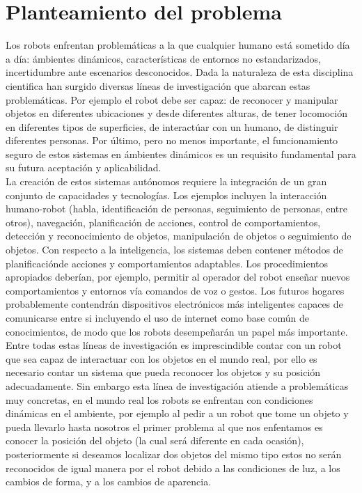 \documentclass[a4paper, openright, 12pt]{report}
\begin{document}
	\section{Planteamiento del problema}
		Los robots enfrentan problemáticas a la que cualquier humano está sometido día a día: ámbientes dinámicos, características de entornos no estandarizados, incertidumbre ante escenarios desconocidos. Dada la naturaleza de esta disciplina cientifica han surgido diversas líneas de investigación que abarcan estas problemáticas. Por ejemplo el robot debe ser capaz: de reconocer y manipular objetos en diferentes ubicaciones y desde diferentes alturas, de tener locomoción en diferentes tipos de superficies, de interactúar con un humano, de distinguir diferentes personas. Por último, pero no menos importante, el funcionamiento seguro de estos sistemas en ámbientes dinámicos es un requisito fundamental para su futura aceptación y aplicabilidad.\\

		La creación de estos sistemas autónomos requiere la integración de un gran conjunto de capacidades y tecnologías. Los ejemplos incluyen la interacción humano-robot (habla, identificación de personas, seguimiento de personas, entre otros), navegación, planificación de acciones, control de comportamientos, detección y reconocimiento de objetos, manipulación de objetos o seguimiento de objetos. Con respecto a la inteligencia, los sistemas deben contener métodos de planificaciónde acciones y comportamientos adaptables. Los procedimientos apropiados deberían, por ejemplo, permitir al operador del robot enseñar nuevos comportamientos y entornos vía comandos de voz o gestos. Los futuros hogares probablemente contendrán dispositivos electrónicos más inteligentes capaces de comunicarse entre si incluyendo el uso de internet como base común de conocimientos, de modo que los robots desempeñarán un papel más importante.\\

		Entre todas estas líneas de investigación es imprescindible contar con un robot que sea capaz de interactuar con los objetos en el mundo real, por ello es necesario contar un sistema que pueda reconocer los objetos y su posición adecuadamente. Sin embargo esta línea de investigación atiende a problemáticas muy concretas, en el mundo real  los robots se enfrentan con condiciones dinámicas en el ambiente, por ejemplo al pedir a un robot que tome un objeto y pueda llevarlo hasta nosotros el primer problema al que nos enfentamos es conocer la posición del objeto (la cual será diferente en cada ocasión), posteriormente si deseamos localizar dos objetos del mismo tipo estos no serán reconocidos de igual manera por el robot debido a las condiciones de luz, a los cambios de forma, y a los cambios de aparencia.\\
\end{document}
